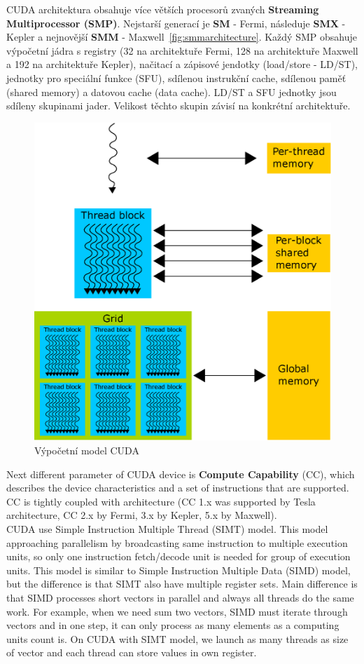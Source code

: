 CUDA architektura obsahuje více větších procesorů zvaných \textbf{Streaming Multiprocessor (SMP)}. Nejstarší generací je \textbf{SM} - Fermi, následuje \textbf{SMX} - Kepler a nejnovější \textbf{SMM} - Maxwell~\autoref{fig:smmarchitecture}. Každý SMP obsahuje výpočetní jádra s registry (32 na architektuře Fermi, 128 na architektuře Maxwell a 192 na architektuře Kepler), načitací a zápisové jendotky (load/store - LD/ST), jednotky pro speciální funkce (SFU), sdílenou instrukční cache, sdílenou paměť (shared memory) a datovou cache (data cache). LD/ST a SFU jednotky jsou sdíleny skupinami jader. Velikost těchto skupin závisí na konkrétní architektuře.\\

\begin{figure}[h]
  \centering
  \includegraphics[width=0.8\linewidth]{img/CUDAmemoryHierarchy.eps}
  \caption{Výpočetní model CUDA}
  \label{fig:cudamemhierarchy}
\end{figure}

Next different parameter of CUDA device is \textbf{Compute Capability} (CC), which describes the device characteristics and a set of instructions that are supported. CC is tightly coupled with architecture (CC 1.x was supported by Tesla architecture, CC 2.x by Fermi, 3.x by Kepler, 5.x by Maxwell).\\

CUDA use Simple Instruction Multiple Thread (SIMT) model. This model approaching parallelism by broadcasting same instruction to multiple execution units, so only one instruction fetch/decode unit is needed for group of execution units. This model is similar to Simple Instruction Multiple Data (SIMD) model, but the difference is that SIMT also have multiple register sets. Main difference is that SIMD processes short vectors in parallel and always all threads do the same work. For example, when we need sum two vectors, SIMD must iterate through vectors and in one step, it can only process as many elements as a computing units count is. On CUDA with SIMT model, we launch as many threads as size of vector and each thread can store values in own register.\\

